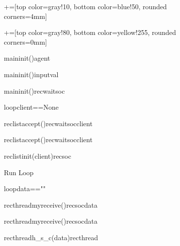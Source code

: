 \documentclass{article}
\begin{document}
\begin{figure}
	\centering
	
	
	\begin{sequencediagram}[.9]
		+=[top color=gray!10, bottom color=blue!50, rounded corners=4mm]
		
		+=[top color=gray!80, bottom color=yellow!255, rounded corners=0mm] 
		
		
		\begin{messcall}{main}{init()}{agent}{}		
		\end{messcall}		
		\begin{messcall}{main}{init()}{inputval}
		\end{messcall}
		\begin{messcall}{main}{init()}{recwaitsoc}{}		
		\end{messcall}		
		\begin{sdblock}{loop}{client==None}
			\begin{call}{reclist}{accept()}{recwaitsoc}{client}
			\end{call}
		\end{sdblock}
		\begin{call}{reclist}{accept()}{recwaitsoc}{client}
		\end{call}		
		\begin{messcall}{reclist}{init(client)}{recsoc}{}
		\end{messcall}			
		\begin{sdblock}[green!20]{Run Loop}{}
			\begin{sdblock}{loop}{data==""}
				\begin{call}{recthread}{myreceive()}{recsoc}{data}
				\end{call}		
			\end{sdblock}	
			\begin{call}{recthread}{myreceive()}{recsoc}{data}
			\end{call}					
			\begin{call}{recthread}{\small h\_s\_c(data)}{recthread}{}

\end{call}
\end{sdblock}
\end{sequencediagram}
\end{figure}
\end{document}
